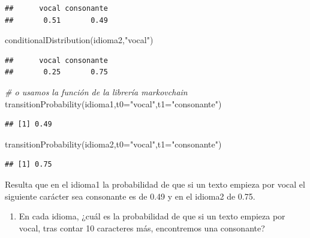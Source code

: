 \documentclass[
]{book}
\newenvironment{Shaded}{\begin{snugshade}}{\end{snugshade}}
\newcommand{\AttributeTok}[1]{\textcolor[rgb]{0.77,0.63,0.00}{#1}}
\newcommand{\CommentTok}[1]{\textcolor[rgb]{0.56,0.35,0.01}{\textit{#1}}}
\newcommand{\FunctionTok}[1]{\textcolor[rgb]{0.00,0.00,0.00}{#1}}
\newcommand{\NormalTok}[1]{#1}
\newcommand{\StringTok}[1]{\textcolor[rgb]{0.31,0.60,0.02}{#1}}
\providecommand{\tightlist}{%
  \setlength{\itemsep}{0pt}\setlength{\parskip}{0pt}}
\theoremstyle{definition}
\theoremstyle{definition}
\theoremstyle{definition}
\theoremstyle{definition}
\theoremstyle{remark}
\begin{document}
\begin{verbatim}
##      vocal consonante 
##       0.51       0.49
\end{verbatim}

\begin{Shaded}
\begin{Highlighting}[]
\FunctionTok{conditionalDistribution}\NormalTok{(idioma2,}\StringTok{"vocal"}\NormalTok{)}
\end{Highlighting}
\end{Shaded}

\begin{verbatim}
##      vocal consonante 
##       0.25       0.75
\end{verbatim}

\begin{Shaded}
\begin{Highlighting}[]
\CommentTok{\# o usamos la función de la librería markovchain}
\FunctionTok{transitionProbability}\NormalTok{(idioma1,}\AttributeTok{t0=}\StringTok{"vocal"}\NormalTok{,}\AttributeTok{t1=}\StringTok{"consonante"}\NormalTok{)}
\end{Highlighting}
\end{Shaded}

\begin{verbatim}
## [1] 0.49
\end{verbatim}

\begin{Shaded}
\begin{Highlighting}[]
\FunctionTok{transitionProbability}\NormalTok{(idioma2,}\AttributeTok{t0=}\StringTok{"vocal"}\NormalTok{,}\AttributeTok{t1=}\StringTok{"consonante"}\NormalTok{)}
\end{Highlighting}
\end{Shaded}

\begin{verbatim}
## [1] 0.75
\end{verbatim}

Resulta que en el idioma1 la probabilidad de que si un texto empieza por vocal el siguiente carácter sea consonante es de 0.49 y en el idioma2 de 0.75.

\begin{enumerate}
\def\labelenumi{\arabic{enumi}.}
\setcounter{enumi}{1}
\tightlist
\item
  En cada idioma, ¿cuál es la probabilidad de que si un texto empieza por vocal, tras contar 10 caracteres más, encontremos una consonante?
\end{enumerate}
\end{document}
